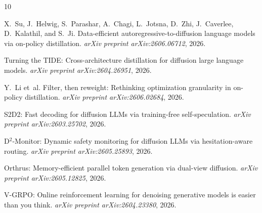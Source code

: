 \documentclass[11pt,a4paper]{article}
\begin{document}

\begin{thebibliography}{10}

X.~Su, J.~Helwig, S.~Parashar, A.~Chagi, L.~Jotsna, D.~Zhi, J.~Caverlee, D.~Kalathil, and S.~Ji.
\newblock Data-efficient autoregressive-to-diffusion language models via on-policy distillation.
\newblock \emph{arXiv preprint arXiv:2606.06712}, 2026.

Turning the {TIDE}: Cross-architecture distillation for diffusion large language models.
\newblock \emph{arXiv preprint arXiv:2604.26951}, 2026.

Y.~Li et~al.
\newblock Filter, then reweight: Rethinking optimization granularity in on-policy distillation.
\newblock \emph{arXiv preprint arXiv:2606.02684}, 2026.

S2D2: Fast decoding for diffusion {LLMs} via training-free self-speculation.
\newblock \emph{arXiv preprint arXiv:2603.25702}, 2026.

D$^2$-Monitor: Dynamic safety monitoring for diffusion {LLMs} via hesitation-aware routing.
\newblock \emph{arXiv preprint arXiv:2605.25893}, 2026.

Orthrus: Memory-efficient parallel token generation via dual-view diffusion.
\newblock \emph{arXiv preprint arXiv:2605.12825}, 2026.

V-GRPO: Online reinforcement learning for denoising generative models is easier than you think.
\newblock \emph{arXiv preprint arXiv:2604.23380}, 2026.

\end{thebibliography}
\end{document}
